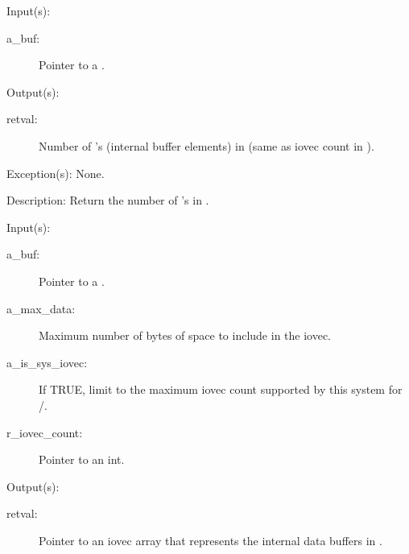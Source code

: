 \begin{capi}
\begin{capilist}
	\end{capilist}
\label{buf_num_bufels_get}
	\begin{capilist}
	\item[Input(s): ]
		\begin{description}\item[]
		\item[a\_buf: ]
			Pointer to a .
		\end{description}
	\item[Output(s): ]
		\begin{description}\item[]
		\item[retval: ]
			Number of 's (internal buffer elements)
			in  (same as iovec count in
			).
		\end{description}
	\item[Exception(s): ] None.
	\item[Description: ]
		Return the number of 's in .
	\end{capilist}
\label{buf_iovec_get}
	\begin{capilist}
	\item[Input(s): ]
		\begin{description}\item[]
		\item[a\_buf: ]
			Pointer to a \classname{buf}.
		\item[a\_max\_data: ]
			Maximum number of bytes of space to include in the
			iovec.
		\item[a\_is\_sys\_iovec: ]
			If TRUE, limit  to the maximum
			iovec count supported by this system for
			/\cfunc{writev}{}.
		\item[r\_iovec\_count: ]
			Pointer to an int.
		\end{description}
	\item[Output(s): ]
		\begin{description}\item[]
		\item[retval: ]
			Pointer to an iovec array that represents the internal
			data buffers in \cvar{a\_buf}.

\end{description}
\end{capilist}
\end{capi}
